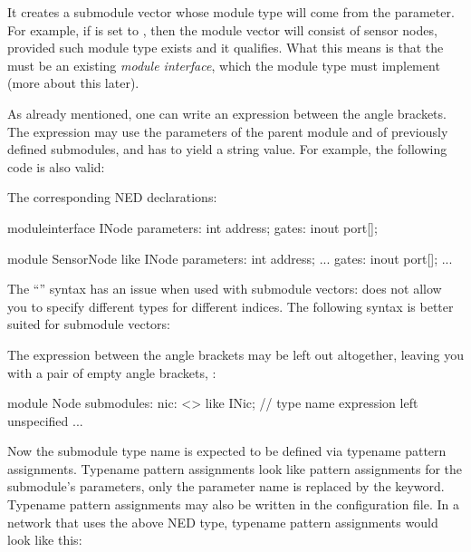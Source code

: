 It creates a submodule vector whose module type will come from the
 parameter. For example, if  is set to ,
then the module vector will consist of sensor nodes, provided such module
type exists and it qualifies. What this means is that the  must be
an existing \textit{module interface}, which the 
module type must implement (more about this later).

As already mentioned, one can write an expression between the angle
brackets. The expression may use the parameters of the parent module and of
previously defined submodules, and has to yield a string value. For
example, the following code is also valid:

\begin{ned}
network Net6
{
    parameters:
        string nodeTypePrefix;
        int variant;
    submodules:
        node[6]: <nodeTypePrefix + "Node" + string(variant)> like INode {
           ...
}
\end{ned}

The corresponding NED declarations:

\begin{ned}
moduleinterface INode
{
    parameters:
        int address;
    gates:
        inout port[];
}

module SensorNode like INode
{
    parameters:
        int address;
        ...
    gates:
        inout port[];
        ...
}
\end{ned}

The ``'' syntax has an issue when used
with submodule vectors: does not allow you to specify different types
for different indices. The following syntax is better suited for
submodule vectors:

The expression between the angle brackets may be left out altogether,
leaving you with a pair of empty angle brackets, \ttt{<>}:

\begin{ned}
module Node
{
    submodules:
        nic: <> like INic;  // type name expression left unspecified
        ...
}
\end{ned}

Now the submodule type name is expected to be defined via typename pattern
assignments. Typename pattern assignments look like pattern assignments for
the submodule's parameters, only the parameter name is replaced by the
 keyword. Typename pattern assignments may also be
written in the configuration file. In a network that uses the above
 NED type, typename pattern assignments would look like this:

